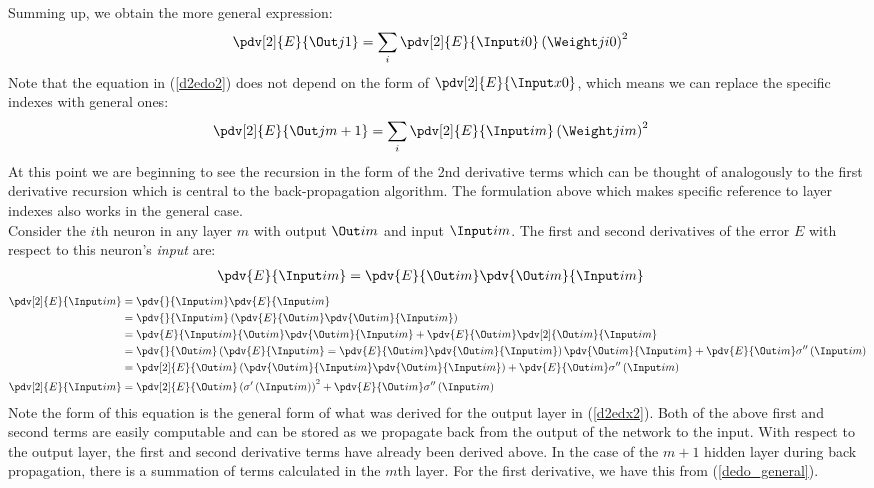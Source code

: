 Summing up, we obtain the more general expression:
\begin{align}
\pdv[2]{E}{{\Out j 1}} &= 
\sum_i\pdv[2]{E}{{\Input i 0}} \left({\Weight j i 0}\right)^2\label{d2edo2}
\end{align}
Note that the equation in (\ref{d2edo2}) does not depend on the form of $\pdv[2]{E}{{\Input x 0}}$, which means we can replace the specific indexes with general ones:
\begin{align}
\pdv[2]{E}{{\Out j {m+1}}} &= \sum_i
\pdv[2]{E}{{\Input i m}} \left({\Weight j i m}\right)^2\label{de2do2_general}
\end{align} 
At this point we are beginning to see the recursion in the form of the 2nd derivative terms which can be thought of analogously to the first derivative recursion which is central to the back-propagation algorithm. The formulation above which makes specific reference to layer indexes also works in the general case.
\\ 
Consider the $i$th neuron in any layer $m$ with output $\Out i m$ and input $\Input i m$. The first and second derivatives of the error $E$ with respect to this neuron's \textit{input} are: 
\begin{align}
\pdv{E}{\Input i m} &= 
\pdv{E}{\Out i m}
\pdv{\Out i m}{\Input i m}\label{dedx_general}
\end{align}
\begin{align}
\pdv[2]{E}{{\Input i m}} &= 
\pdv{}{{\Input i m}}
\pdv{E}{{\Input i m}} 
\\
&= \pdv{}{\Input i m}
\left(
\pdv{E}{\Out i m}
\pdv{\Out i m}{\Input i m}
\right)
\\
&= \pdv{E}{\Input i m}{\Out i m}
\pdv{\Out i m}{\Input i m}
+
\pdv{E}{\Out i m}\pdv[2]{{\Out i m}}{{\Input i m}}
\\
&=\pdv{}{{\Out i m}}
\left(\pdv{E}{\Input i m} = \pdv{E}{{\Out i m}}\pdv{{\Out i m}}{{\Input i m}}\right)
\pdv{{\Out i m}}{{\Input i m}}
+
\pdv{E}{\Out i m}\sigma^{\prime\prime}\left(\Input i m\right)
\\
&=\pdv[2]{E}{{\Out i m}}
\left
(\pdv{{\Out i m}}{{\Input i m}}
\pdv{{\Out i m}}{{\Input i m}}
\right)
+
\pdv{E}{\Out i m}\sigma^{\prime\prime}\left(\Input i m\right)
\\
\pdv[2]{E}{{\Input i m}} &= 
\pdv[2]{E}{{\Out i m}} \left(\sigma^{\prime}\left({\Input i m}\right)\right)^2
+
\pdv{E}{{\Out i m}}\sigma^{\prime\prime}\left(\Input i m\right)
\end{align}
Note the form of this equation is the general form of what was derived for the output layer in (\ref{d2edx2}). Both of the above first and second terms are easily computable and can be stored as we propagate back from the output of the network to the input. With respect to the output layer, the first and second derivative terms have already been derived above. In the case of the $m + 1$ hidden layer during back propagation, there is a summation of terms calculated in the $m$th layer. For the first derivative, we have this from (\ref{dedo_general}).
